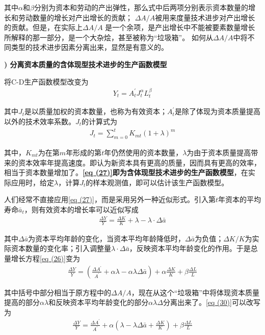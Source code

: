 	其中$ \alpha $和$ \beta $分别为资本和劳动的产出弹性，那么式中后两项分别表示资本数量的增长和劳动数量的增长对产出增长的贡献；
	$ \Delta A / A $被用来度量技术进步对产出增长的贡献。但是，在实际上$ \Delta A / A $ 是一个余项，是产出增长中不能被要素数量增长所解释的那一部分，是一个大杂烩，甚至被称为“垃圾箱”。
	如何从$ \Delta A / A $中将不同类型的技术进步因素分离出来，显然是有意义的。
	
{\bf {}) 分离资本质量的含体现型技术进步的生产函数模型}
	
	将C-D生产函数模型改变为
	\begin{align}
		Y_{t}=A_{t}^{\prime} J_{t}^{\alpha} L_{t}^{\beta} \label{eq (27)}
	\end{align} 

	其中$ J_{t} $是以质量加权的资本数量，也称为有效资本；$ A_{t}^{\prime} $是除了体现为资本质量提高以外的技术效率系数。$ J_{t} $的计算式为
	\begin{align}
		J_{t}=\sum_{m=0}^{t} K_{m t}(1+\lambda)^{m} \label{eq (28)}
	\end{align}

	其中，$ K_{m t} $为在第$ m $年形成的第$ t $年仍然使用的资本数量，$ \lambda $为由于资本质量提高带来的资本效率年提高速度。即认为新资本具有更高的质量，因而具有更高的效率，相当于资本数量增加了。\textbf{\eqref{eq (27)}即为含体现型技术进步的生产函数模型}，在实际应用时，给定$ \lambda $，计算$ J_{t} $的样本观测值，即可以估计该生产函数模型。
		
	人们经常不直接应用\eqref{eq (27)}，而是采用另外一种近似形式。引入第$ t $年资本的平均寿命$ \bar{a}_{t} $，则有效资本的增长率可以近似写成
	\begin{align}
		\frac{\Delta Y}{Y}=\frac{\Delta K}{K}+\lambda-\lambda \cdot \Delta \bar{a}
		\label{eq (29)}
	\end{align}
		
	其中$ \Delta \bar{a} $为资本平均年龄的变化，当资本平均年龄降低时，$ \Delta \bar{a} $为负值；$ \Delta K / K$为实际资本数量的变化率；引入调整量$ \lambda \cdot \Delta \bar{a} $，$ $反映资本平均年龄变化的作用。于是总量增长方程\eqref{eq (26)}变为
	\begin{align}
		\frac{\Delta Y}{Y}=\left(\frac{\Delta A^{\prime}}{A^{\prime}}+\alpha \lambda-\alpha \lambda \Delta \bar{a}\right)+\alpha \frac{\Delta K}{K}+\beta \frac{\Delta L}{L}
		\label{eq (30)}
	\end{align}
		
	其中括号中部分相当于原方程中的$ \Delta A / A $，现在从这个“垃圾箱”中将体现资本质量提高的部分$ \alpha \lambda $和反映资本平均年龄变化的部分$ \alpha \lambda \Delta $分离出来了。\eqref{eq (30)}可以改写为
	\begin{align}
		\frac{\Delta Y}{Y}=\frac{\Delta A^{\prime}}{A^{\prime}}+\alpha\left(\lambda-\lambda \Delta \bar{a}+\frac{\Delta K}{K}\right)+\beta \frac{\Delta L}{L} 
		\label{eq (31)}
	\end{align}
	
